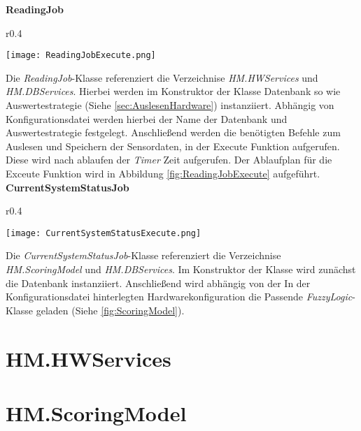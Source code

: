 \textbf{ReadingJob}\\
\begin{wrapfigure}{r}{0.4\textwidth}
    \vspace{-1.2cm}
    \begin{center}
      \texttt{[image: ReadingJobExecute.png]}
    \end{center}
    \vspace{-0.5cm}
    \caption{}
    \label{fig:ReadingJobExecute}
  \end{wrapfigure}
Die \textit{ReadingJob}-Klasse referenziert die Verzeichnise \textit{HM.HWServices} und \textit{HM.DBServices}. Hierbei werden im Konstruktor der Klasse Datenbank so wie Auswertestrategie (Siehe \ref{sec:AuslesenHardware}) instanziiert. Abhängig von Konfigurationsdatei werden hierbei der Name der Datenbank und Auswertestrategie festgelegt. Anschließend werden die benötigten Befehle zum Auslesen und Speichern der Sensordaten, in der Execute Funktion aufgerufen. Diese wird nach ablaufen der \textit{Timer} Zeit aufgerufen. Der Ablaufplan für die Exceute Funktion wird in Abbildung \ref{fig:ReadingJobExecute} aufgeführt.
\newpage
\textbf{CurrentSystemStatusJob}\\
\begin{wrapfigure}{r}{0.4\textwidth}
    \vspace{-1.2cm}
    \begin{center}
      \texttt{[image: CurrentSystemStatusExecute.png]}
    \end{center}
    \vspace{-0.5cm}
    \caption{}
    \label{fig:CurrentSystemStatusExecuteJobExecute}
  \end{wrapfigure}
Die \textit{CurrentSystemStatusJob}-Klasse referenziert die Verzeichnise \textit{HM.ScoringModel} und \textit{HM.DBServices}. Im Konstruktor der Klasse wird zunächst die Datenbank instanziiert. Anschließend wird abhängig von der In der Konfigurationsdatei hinterlegten Hardwarekonfiguration die Passende \textit{FuzzyLogic}-Klasse geladen (Siehe \ref{fig:ScoringModel}).

\section{HM.HWServices}





\newpage
\section{HM.ScoringModel}